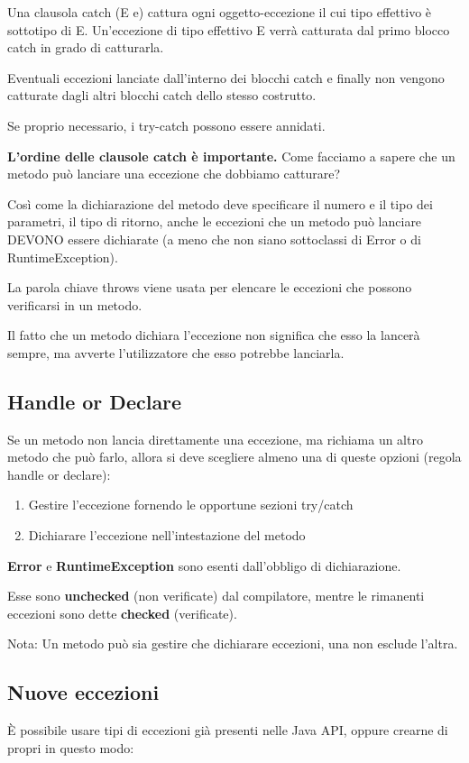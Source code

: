 \documentclass[10pt]{article}
\begin{document}
Una clausola catch (E e) cattura ogni oggetto-eccezione il cui
tipo effettivo è sottotipo di E.
Un’eccezione di tipo effettivo E verrà catturata dal primo blocco
catch in grado di catturarla.

Eventuali eccezioni lanciate dall’interno dei blocchi catch e finally
non vengono catturate dagli altri blocchi catch dello stesso
costrutto.

Se proprio necessario, i try-catch possono essere annidati.

\textbf{L’ordine delle clausole catch è importante.}
Come facciamo a sapere che un metodo può lanciare una
eccezione che dobbiamo catturare?

Così come la dichiarazione del metodo deve specificare il numero
e il tipo dei parametri, il tipo di ritorno, anche le eccezioni che un
metodo può lanciare DEVONO essere dichiarate (a meno che non
siano sottoclassi di Error o di RuntimeException).

La parola chiave throws viene usata per elencare le eccezioni che
possono verificarsi in un metodo.

Il fatto che un metodo dichiara l’eccezione non significa che esso
la lancerà sempre, ma avverte l’utilizzatore che esso potrebbe
lanciarla.
\subsection{Handle or Declare}
Se un metodo non lancia direttamente una eccezione, ma
richiama un altro metodo che può farlo, allora si deve scegliere
almeno una di queste opzioni (regola handle or declare):
\begin{enumerate}
    \item Gestire l’eccezione fornendo le opportune sezioni try/catch
    \item  Dichiarare l’eccezione nell’intestazione del metodo
\end{enumerate}
\textbf{Error} e \textbf{RuntimeException} sono esenti dall’obbligo di dichiarazione.

Esse sono \textbf{unchecked} (non verificate) dal compilatore, mentre le
rimanenti eccezioni sono dette \textbf{checked} (verificate).

Nota: Un metodo può sia gestire che dichiarare eccezioni, una non esclude l'altra.
\subsection{Nuove eccezioni}
È possibile usare tipi di eccezioni già presenti nelle Java API,
oppure crearne di propri in questo modo:
\end{document}
